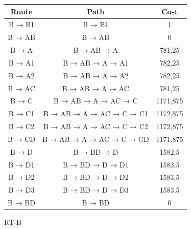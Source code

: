 \documentclass[a4paper, titlepage,12pt]{article}
\begin{document}
		\begin{figure}[H]
			\begin{center}
			\begin{tabular}{|c|c|c|}

				\hline
Route & Path & Cost \\
\hline
B → B1 & B → B1 & 1 \\
\hline
B → AB & B → AB & 0 \\
\hline
B → A & B → AB → A & 781,25 \\
\hline
B → A1 & B → AB → A → A1 & 782,25 \\
\hline
B → A2 & B → AB → A → A2 & 782,25 \\
\hline
B → AC & B → AB → A → AC & 781,25 \\
\hline
B → C & B → AB → A → AC → C & 1171,875 \\
\hline
B → C1 & B → AB → A → AC → C → C1 & 1172,875 \\
\hline
B → C2 & B → AB → A → AC → C → C2 & 1172,875 \\
\hline
B → CD & B → AB → A → AC → C → CD & 1171,875 \\
\hline
B → D & B → BD → D & 1582,5 \\
\hline
B → D1 & B → BD → D → D1 & 1583,5 \\
\hline
B → D2 & B → BD → D → D2 & 1583,5 \\
\hline
B → D3 & B → BD → D → D3 & 1583,5 \\
\hline
B → BD & B → BD & 0 \\
\hline

			\end{tabular}
			\caption{RT-B}
			\end{center}
		\end{figure}
\end{document}
